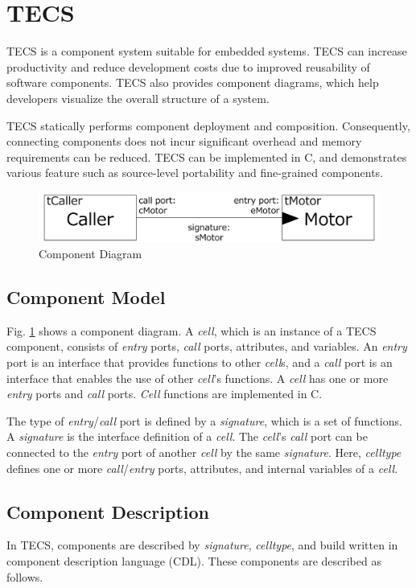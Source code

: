 \documentclass[a4j,12pt,oneside,openany,english]{jsbook}
\begin{document}
\section{TECS}
\label{sec:TECS}

TECS is a component system suitable for embedded systems.
TECS can increase productivity and reduce development costs due to improved reusability of software components.
TECS also provides component diagrams, which help developers visualize the overall structure of a system.

TECS statically performs component deployment and composition.
Consequently, connecting components does not incur significant overhead and memory requirements can be reduced.
TECS can be implemented in C, and demonstrates various feature such as source-level portability and fine-grained components.

\begin{figure}[t]
    \centering
    \includegraphics[width=12cm,clip]{figure/component_diagram.pdf}
    \caption{Component Diagram}
    \label{fig:component}
\end{figure}

\subsection{Component Model}
Fig. \ref{fig:component} shows a component diagram.
A {\it cell}, which is an instance of a TECS component, consists of {\it entry} ports, {\it call} ports, attributes, and variables.
An {\it entry} port is an interface that provides functions to other {\it cell}s, and a {\it call} port is an interface that enables the use of other {\it cell}'s functions.
A {\it cell} has one or more {\it entry} ports and {\it call} ports.
{\it Cell} functions are implemented in C.

The type of {\it entry}/{\it call} port is defined by a {\it signature}, which is a set of functions.
A {\it signature} is the interface definition of a {\it cell}.
The {\it cell}'s  {\it call} port can be connected to the {\it entry} port of another {\it cell} by the same {\it signature}.
Here, {\it celltype} defines one or more {\it call}/{\it entry} ports, attributes, and internal variables of a {\it cell}.


\subsection{Component Description}
In TECS, components are described by {\it signature}, {\it celltype}, and build written in component description language (CDL).
These components are described as follows.
\end{document}
